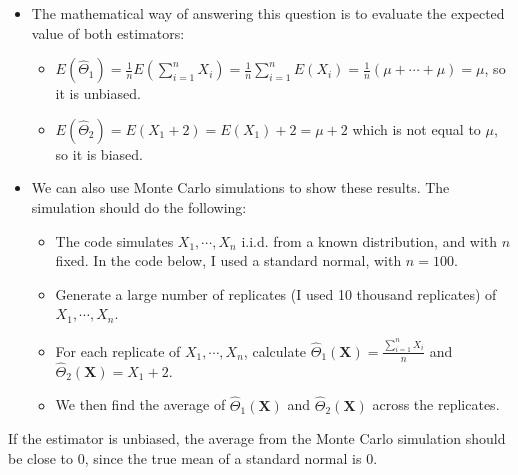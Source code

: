 \documentclass[
]{book}
\providecommand{\tightlist}{%
  \setlength{\itemsep}{0pt}\setlength{\parskip}{0pt}}
\begin{document}
\begin{itemize}
\item
  The mathematical way of answering this question is to evaluate the expected value of both estimators:

  \begin{itemize}
  \item
    \(E(\hat{\Theta}_1) = \frac{1}{n}E(\sum_{i=1}^n X_i) = \frac{1}{n}\sum_{i=1}^n E(X_i) = \frac{1}{n}(\mu + \cdots + \mu) = \mu\), so it is unbiased.
  \item
    \(E(\hat{\Theta}_2) = E(X_1 + 2) = E(X_1) + 2 = \mu +2\) which is not equal to \(\mu\), so it is biased.
  \end{itemize}
\item
  We can also use Monte Carlo simulations to show these results. The simulation should do the following:

  \begin{itemize}
  \tightlist
  \item
    The code simulates \(X_1, \cdots, X_{n}\) i.i.d. from a known distribution, and with \(n\) fixed. In the code below, I used a standard normal, with \(n=100\).\\
  \item
    Generate a large number of replicates (I used 10 thousand replicates) of \(X_1, \cdots, X_{n}\).
  \item
    For each replicate of \(X_1, \cdots, X_{n}\), calculate \(\hat{\Theta}_1(\boldsymbol{X}) = \frac{\sum_{i=1}^n X_i}{n}\) and \(\hat{\Theta}_2(\boldsymbol{X}) = X_1 + 2\).
  \item
    We then find the average of \(\hat{\Theta}_1(\boldsymbol{X})\) and \(\hat{\Theta}_2(\boldsymbol{X})\) across the replicates.
  \end{itemize}
\end{itemize}

If the estimator is unbiased, the average from the Monte Carlo simulation should be close to 0, since the true mean of a standard normal is 0.
\end{document}
